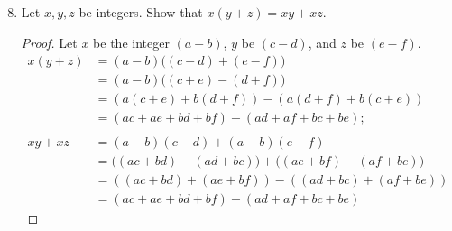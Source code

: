 \documentclass[../../main.tex]{subfiles}
\begin{document}
\subsection{}
\begin{enumerate}
    \setcounter{enumi}{7}
    \item 
    \begin{q}
        Let $x, y, z$ be integers. Show that $x(y+z)=xy+xz$.
    \end{q}
    \begin{proof} 
        Let $x$ be the integer $(a-b)$, $y$ be $(c-d)$, and $z$ be $(e-f)$.
        \begin{align*}
            x(y+z) &= (a-b)\big((c-d)+(e-f)\big) \\
            &= (a-b)\big((c+e)-(d+f)\big) \\
            &= (a(c+e)+b(d+f))-(a(d+f)+b(c+e))\\
            &= (ac+ae+bd+bf)-(ad+af+bc+be); \\ \\
            xy + xz &= (a-b)(c-d)+(a-b)(e-f) \\
            &= \big((ac+bd)-(ad+bc)\big)+\big((ae+bf)-(af+be)\big) \\
            &= ((ac+bd)+(ae+bf))-((ad+bc)+(af+be)) \\
            &= (ac+ae+bd+bf)-(ad+af+bc+be)
        \end{align*}
    \end{proof}
\end{enumerate}
\end{document}
